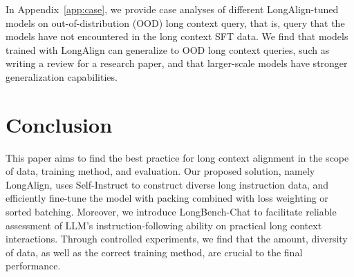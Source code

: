In Appendix~\ref{app:case}, we provide case analyses of different LongAlign-tuned models on out-of-distribution (OOD) long context query, that is, query that the models have not encountered in the long context SFT data.
We find that models trained with LongAlign can generalize to OOD long context queries, such as writing a review for a research paper, and that larger-scale models have stronger generalization capabilities.
\section{Conclusion}
\label{sec:conclusion}

This paper aims to find the best practice for long context alignment in the scope of data, training method, and evaluation.
Our proposed solution, namely LongAlign, uses Self-Instruct to construct diverse long instruction data, and efficiently fine-tune the model with packing combined with loss weighting or sorted batching.
Moreover, we introduce LongBench-Chat to facilitate reliable assessment of LLM's instruction-following ability on practical long context interactions.
Through controlled experiments, we find that the amount, diversity of data, as well as the correct training method, are crucial to the final performance.

